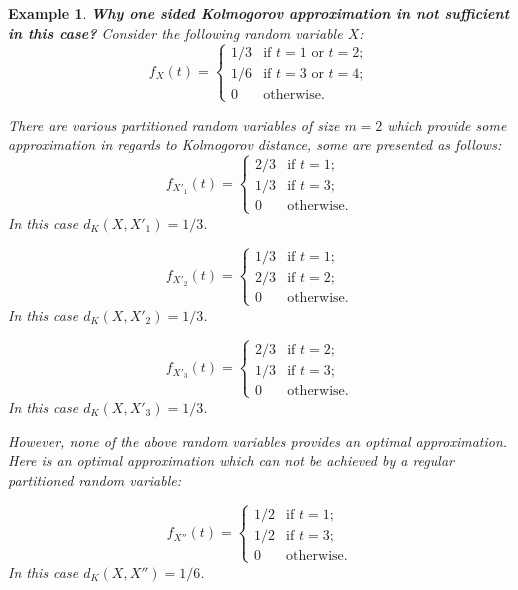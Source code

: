 \documentclass{article}
\newtheorem{example}{Example}
\begin{document}
\begin{example}\textbf{Why one sided Kolmogorov approximation in not sufficient in this case?}
	Consider the following random variable $X$: 
	$$
	f_{X}(t) = \begin{cases}
	1/3           & \text{if $t=1$ or $t=2$} ;  \\ 
	1/6           & \text{if $t=3$ or $t=4$};  \\  
	0             & \text{otherwise.}
	\end{cases}
	$$
	
	There are various partitioned random variables of size $m=2$ which provide some approximation in regards to Kolmogorov distance, some are presented as follows:
	$$
	f_{X'_1}(t) = \begin{cases}
	2/3           & \text{if } t=1;  \\ 
	1/3           & \text{if } t=3;  \\  
	0             & \text{otherwise.}
	\end{cases}
	$$
	In this case $d_K(X, X'_1) = 1/3$.
	
	$$
	f_{X'_2}(t) = \begin{cases}
	1/3           & \text{if } t=1;  \\ 
	2/3           & \text{if } t=2;  \\  
	0             & \text{otherwise.}
	\end{cases}
	$$
	In this case $d_K(X, X'_2) = 1/3$.
	
	$$
	f_{X'_3}(t) = \begin{cases}
	2/3           & \text{if } t=2;  \\ 
	1/3           & \text{if } t=3;  \\  
	0             & \text{otherwise.}
	\end{cases}
	$$
	In this case $d_K(X, X'_3) = 1/3$.
	
	However, none of the above random variables provides an optimal approximation. Here is an optimal approximation which can not be achieved by a regular partitioned random variable:
	
	$$ 	f_{X''}(t) = \begin{cases}
	1/2           & \text{if } t=1;  \\ 
	1/2           & \text{if } t=3;  \\  
	0             & \text{otherwise.}
	\end{cases}
	$$
	In this case $d_K(X, X'') = 1/6$.
\end{example}

{}

\end{document}
